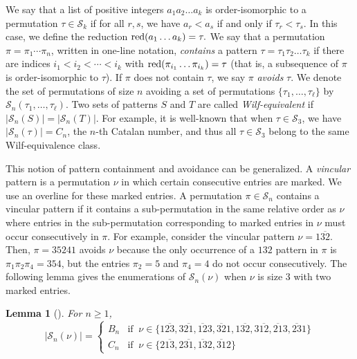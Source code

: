 \documentclass[11pt]{article}
\newcommand{\ol}[1]{\overline{#1}}
\renewcommand\S{\mathcal S}
\newtheorem{lemma}[theorem]{Lemma}
\theoremstyle{definition}
\begin{document}
We say that a list of positive integers $a_1a_2\ldots a_k$ is order-isomorphic to a permutation $\tau\in\S_k$ if for all $r,s$, we have $a_{r} < a_{s}$ if and only if $\tau_r < \tau_s$. In this case, we define the reduction ${\rm red}(a_1\ldots a_k) = \tau.$
We say that a permutation $\pi = \pi_1\cdots\pi_n$, written in one-line notation, \emph{contains} a pattern $\tau = \tau_1\tau_2\ldots \tau_k$ if there are indices $i_1 < i_2 < \cdots < i_k$ with ${\rm red}(\pi_{i_1}\ldots \pi_{i_k}) = \tau$ (that is, a subsequence of $\pi$ is order-isomorphic to $\tau$). If $\pi$ does not contain $\tau$, we say $\pi$ \emph{avoids} $\tau$. We denote the set of permutations of size $n$ avoiding a set of permutations $\{\tau_1,\dots,\tau_\ell\}$ by $\S_n(\tau_1,\dots,\tau_\ell)$. Two sets of patterns $S$ and $T$ are called \textit{Wilf-equivalent} if $|\S_n(S)|=|\S_n(T)|$. For example, it is well-known that when $\tau\in\S_3$, we have $|\S_n(\tau)|=C_n$, the $n$-th Catalan number, and thus all $\tau\in\S_3$ belong to the same Wilf-equivalence class.

This notion of pattern containment and avoidance can be generalized. A \textit{vincular} pattern is a permutation $\nu$ in which certain consecutive entries are marked. We use an overline for these marked entries. A permutation $\pi \in \S_n$ contains a vincular pattern if it contains a sub-permutation in the same relative order as $\nu$ where entries in the sub-permutation corresponding to marked entries in $\nu$ must occur consecutively in $\pi$. For example, consider the vincular pattern $\nu = 1 \ol{32}$. Then, $\pi = 35241$ avoids $\nu$ because the only occurrence of a $132$ pattern in $\pi$ is $\pi_1\pi_2\pi_4 = 354$, but the entries $\pi_2=5$ and $\pi_4=4$ do not occur consecutively. The following lemma gives the enumerations of $\S_n(\nu)$ when $\nu$ is size 3 with two marked entries.
\begin{lemma}[\cite{Cl01}] \label{lem: vincAvoidance}
   For $n \geq 1$,
    \[
    |\S_n(\nu)| = 
    \begin{cases}
        B_n &\text{if} \;\; \nu\in \{1\ol{23}, 3\ol{21}, \ol{12}3, \ol{32}1, 1\ol{32}, 3\ol{12}, \ol{21}3, \ol{23}1\}\\
        C_n &\text{if} \;\; \nu \in \{2\ol{13}, 2\ol{31}, \ol{13}2, \ol{31}2\}
    \end{cases}
    \]
\end{lemma}
\end{document}

